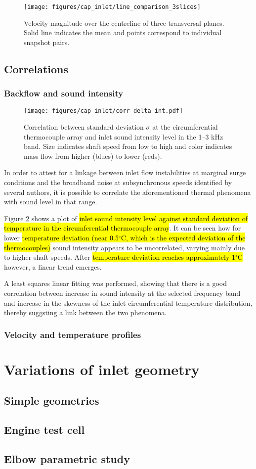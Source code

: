 \begin{figure}[b!]
\centering
\texttt{[image: figures/cap\_inlet/line\_comparison\_3slices]}
\caption{Velocity magnitude over the centreline of three transversal planes. Solid line indicates the mean and points correspond to individual snapshot pairs.}
\label{fig:line_comp_3slices}
\end{figure}

\subsection{Correlations}

\subsubsection{Backflow and sound intensity}

\begin{figure}[htb!]
\centering
\texttt{[image: figures/cap\_inlet/corr\_delta\_int.pdf]}
\caption{Correlation between standard deviation $\sigma$ at the circumferential thermocouple array and inlet sound intensity level in the 1--3 kHz band. Size indicates shaft speed from low to high and color indicates mass flow from higher (blues) to lower (reds).}
\label{fig:corr1}
\end{figure}

In order to attest for a linkage between inlet flow instabilities at marginal surge conditions and the broadband noise at subsynchronous speeds identified by several authors, it is possible to correlate the aforementioned thermal phenomena with sound level in that range.

Figure \ref{fig:corr1} shows a plot of \hl{inlet sound intensity level against standard deviation of temperature in the circumferential thermocouple array}. It can be seen how for lower \hl{temperature deviation (near 0.5$^{\circ}$C, which is the expected deviation of the thermocouples)} sound intensity appears to be uncorrelated, varying mainly due to higher shaft speeds. After \hl{temperature deviation reaches approximately 1$^{\circ}$C} however, a linear trend emerges. 

A least squares linear fitting was performed, showing that there is a good correlation between increase in sound intensity at the selected frequency band and increase in the skewness of the inlet circumferential temperature distribution, thereby suggsting a link between the two phenomena.

\subsubsection{Velocity and temperature profiles}

\section{Variations of inlet geometry}
\label{sec:inlet_geo_var}

\subsection{Simple geometries}
\subsection{Engine test cell}
\subsection{Elbow parametric study}
